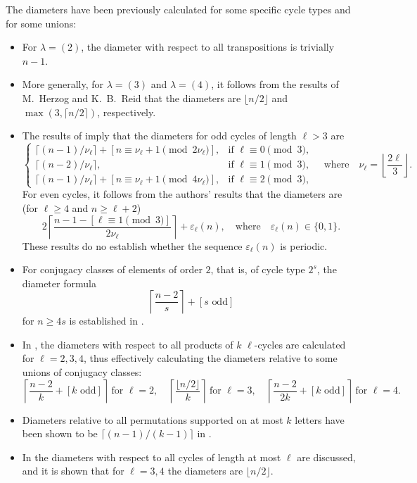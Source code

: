 \documentclass[DIV=12,10pt]{scrartcl}
\theoremstyle{definition}
\begin{document}
The diameters have been previously calculated for some specific cycle types and for some unions:
\begin{itemize}
\item For $\lambda=(2)$, the diameter with respect to all transpositions is trivially $n-1$.
\item More generally, for $\lambda=(3)$ and $\lambda=(4)$, it follows from the results of M.~Herzog and K.~B.~Reid \cite{HerzogReidCycles} that the diameters are $\lfloor n/2\rfloor$ and $\max(3, \lceil n/2\rceil)$, respectively.
\item The results of \cite{ProductsOfCycleClassesI,ProductsOfCycleClassesII} imply that the diameters for odd cycles of length $\ell>3$ are
\[
	\begin{cases}
		\lceil (n-1)/\nu_\ell\rceil + [n\equiv \nu_\ell+1 \pmod{2\nu_\ell}], & \text{if } \ell\equiv 0 \pmod{3}, \\
		\lceil (n-2)/\nu_\ell\rceil, & \text{if } \ell\equiv 1\pmod{3}, \\
		\lceil (n-1)/\nu_\ell\rceil + [n\equiv \nu_\ell+1 \pmod{4\nu_\ell}], & \text{if } \ell\equiv 2 \pmod{3},
	\end{cases}
	\quad\text{where}\quad
	\nu_\ell = \left\lfloor \frac{2\ell}{3} \right\rfloor.
\]
For even cycles, it follows from the authors' results that the diameters are (for $\ell\geqslant 4$ and $n\geqslant\ell+2$)
\[
	2\left\lceil \frac{n-1-[\ell\equiv 1\pmod{3}]}{2\nu_\ell} \right\rceil + \varepsilon_\ell(n),
	\quad\text{where}\quad
	\varepsilon_\ell(n) \in \{0,1\}.
\]
These results do no establish whether the sequence $\varepsilon_\ell(n)$ is periodic.
\item For conjugacy classes of elements of order $2$, that is, of cycle type $2^s$, the diameter formula
\[
	\left\lceil \frac{n-2}{s} \right\rceil + [\text{$s$ odd}]
\]
for $n\geqslant 4s$ is established in \cite{PhongpattanacharoenSiemons}.
\item In \cite{KMCycles}, the diameters with respect to all products of $k$ $\ell$-cycles are calculated for $\ell=2,3,4$, thus effectively calculating the diameters relative to some unions of conjugacy classes:
\[
	\left\lceil \frac{n-2}{k} + [\text{$k$ odd}] \right\rceil\ \text{for $\ell=2$}, \quad
	\left\lceil \frac{\lfloor n/2\rfloor}{k} \right\rceil\ \text{for $\ell=3$}, \quad
	\left\lceil \frac{n-2}{2k} + [\text{$k$ odd}] \right\rceil\ \text{for $\ell=4$}.
\]
\item Diameters relative to all permutations supported on at most $k$ letters have been shown to be $\lceil (n-1)/(k-1) \rceil$ in \cite[Lemma~14]{Mastermind}.
\item In \cite{CicirelloCycleMutation} the diameters with respect to all cycles of length at most $\ell$ are discussed, and it is shown that for $\ell=3,4$ the diameters are $\lfloor n/2\rfloor$.
\end{itemize}
\end{document}
